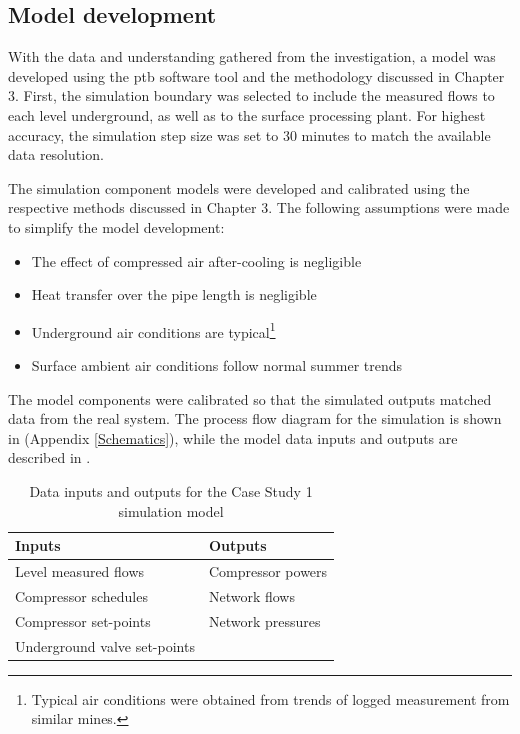\subsection{Model development}
With the data and understanding gathered from the investigation, a model was developed using the \gls{ptb} software tool and the methodology discussed in Chapter 3. First, the simulation boundary was selected to include the measured flows to each level underground, as well as to the surface processing plant. For highest accuracy, the simulation step size was set to 30 minutes to match the available data resolution.
\par
The simulation component models were developed and calibrated using the respective methods discussed in Chapter 3. The following assumptions were made to simplify the model development:
\begin{itemize}
	\item The effect of compressed air after-cooling is negligible
	\item Heat transfer over the pipe length is negligible
	\item Underground air conditions are typical\footnote{Typical air conditions were obtained from trends of logged measurement from similar mines.}
	\item Surface ambient air conditions follow normal summer trends
\end{itemize} 
The model components were calibrated so that the simulated outputs matched data from the real system. The process flow diagram for the simulation is shown in  (Appendix \ref{Schematics}), while the model data inputs and outputs are described in .\\

\begin{table}[h!]
	\caption{Data inputs and outputs for the Case Study 1 simulation model }
	\centering
	\begin{tabular}{ll}
		\hline
		Inputs \hspace*{4cm} &Outputs \hspace*{4cm} \\ \hline
		Level measured flows&Compressor powers \\
		Compressor schedules& Network flows \\
		Compressor  set-points& Network pressures \\
		Underground valve  set-points& \\
		\hline
	\end{tabular}
	\label{table: Mine A inputs/outputs}
\end{table}

